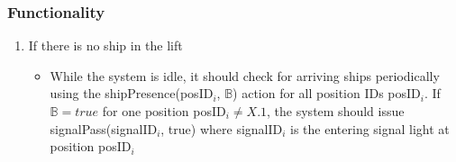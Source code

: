 \subsubsection*{Functionality}
\begin{enumerate}
	\item If there is no ship in the lift
		\begin{itemize}
			\item While the system is idle, it should check for arriving ships periodically using the shipPresence(posID$_i$, $\mathbb{B}$) action for all position IDs posID$_i$. If $\mathbb{B} = true$ for one position posID$_i \neq X.1$, the system should issue signalPass(signalID$_i$, true) where signalID$_i$ is the entering signal light at position posID$_i$
		\end{itemize}
		

\end{enumerate}
